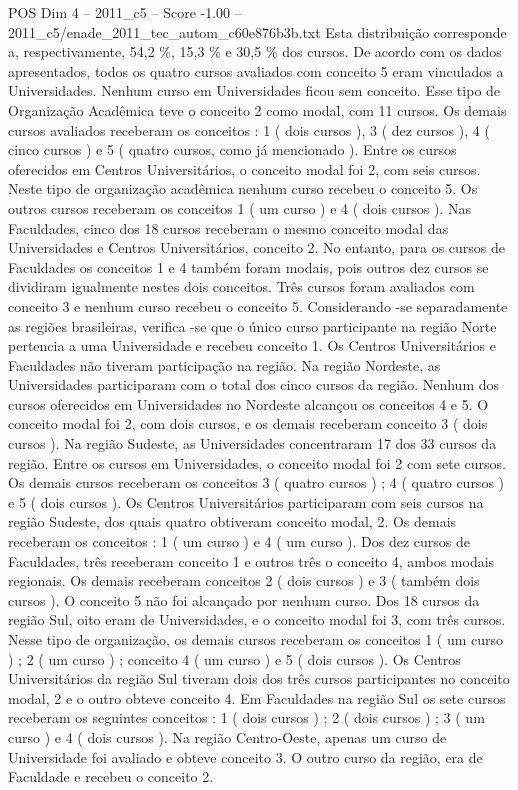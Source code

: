 \begin{textsample}{POS Dim 4 – 2011\_c5 – Score -1.00 – 2011\_c5/enade\_2011\_tec\_autom\_c60e876b3b.txt}
Esta distribuição corresponde a, respectivamente, 54,2 \%, 15,3 \% e 30,5 \% dos cursos.
De acordo com os dados apresentados, todos os quatro cursos avaliados com conceito 5 eram vinculados a Universidades.
Nenhum curso em Universidades ficou sem conceito.
Esse tipo de Organização Acadêmica teve o conceito 2 como modal, com 11 cursos.
Os demais cursos avaliados receberam os conceitos : 1 ( dois cursos ), 3 ( dez cursos ), 4 ( cinco cursos ) e 5 ( quatro cursos, como já mencionado ).
Entre os cursos oferecidos em Centros Universitários, o conceito modal foi 2, com seis cursos.
Neste tipo de organização acadêmica nenhum curso recebeu o conceito 5.
Os outros cursos receberam os conceitos 1 ( um curso ) e 4 ( dois cursos ).
Nas Faculdades, cinco dos 18 cursos receberam o mesmo conceito modal das Universidades e Centros Universitários, conceito 2.
No entanto, para os cursos de Faculdades os conceitos 1 e 4 também foram modais, pois outros dez cursos se dividiram igualmente nestes dois conceitos.
Três cursos foram avaliados com conceito 3 e nenhum curso recebeu o conceito 5.
Considerando -se separadamente as regiões brasileiras, verifica -se que o único curso participante na região Norte pertencia a uma Universidade e recebeu conceito 1.
Os Centros Universitários e Faculdades não tiveram participação na região.
Na região Nordeste, as Universidades participaram com o total dos cinco cursos da região.
Nenhum dos cursos oferecidos em Universidades no Nordeste alcançou os conceitos 4 e 5.
O conceito modal foi 2, com dois cursos, e os demais receberam conceito 3 ( dois cursos ).
Na região Sudeste, as Universidades concentraram 17 dos 33 cursos da região.
Entre os cursos em Universidades, o conceito modal foi 2 com sete cursos.
Os demais cursos receberam os conceitos 3 ( quatro cursos ) ; 4 ( quatro cursos ) e 5 ( dois cursos ).
Os Centros Universitários participaram com seis cursos na região Sudeste, dos quais quatro obtiveram conceito modal, 2.
Os demais receberam os conceitos : 1 ( um curso ) e 4 ( um curso ).
Dos dez cursos de Faculdades, três receberam conceito 1 e outros três o conceito 4, ambos modais regionais.
Os demais receberam conceitos 2 ( dois cursos ) e 3 ( também dois cursos ).
O conceito 5 não foi alcançado por nenhum curso.
Dos 18 cursos da região Sul, oito eram de Universidades, e o conceito modal foi 3, com três cursos.
Nesse tipo de organização, os demais cursos receberam os conceitos 1 ( um curso ) ; 2 ( um curso ) ; conceito 4 ( um curso ) e 5 ( dois cursos ).
Os Centros Universitários da região Sul tiveram dois dos três cursos participantes no conceito modal, 2 e o outro obteve conceito 4.
Em Faculdades na região Sul os sete cursos receberam os seguintes conceitos : 1 ( dois cursos ) ; 2 ( dois cursos ) ; 3 ( um curso ) e 4 ( dois cursos ).
Na região Centro-Oeste, apenas um curso de Universidade foi avaliado e obteve conceito 3.
O outro curso da região, era de Faculdade e recebeu o conceito 2.

\end{textsample}
